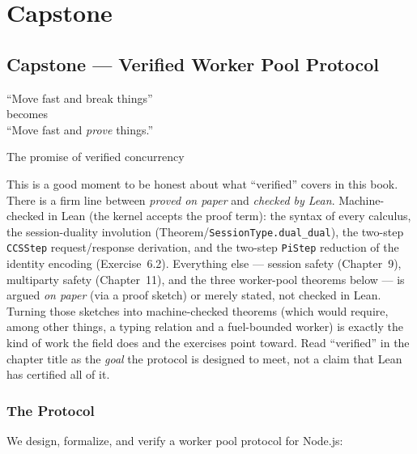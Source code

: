 \documentclass[11pt, a4paper, oneside]{book}
\newcommand{\lc}[1]{\texttt{#1}}
\newcounter{exercise}[chapter]
\begin{document}
\part{Capstone}

\chapter{Capstone --- Verified Worker Pool Protocol}

\epigraph{``Move fast and break things''\\
\normalfont becomes\\
``Move fast and \emph{prove} things.''}%
{The promise of verified concurrency}

\begin{warning}[title={``Verified'' means two different things --- be precise}]
This is a good moment to be honest about what ``verified'' covers in this book.
There is a firm line between \emph{proved on paper} and \emph{checked by Lean}.
Machine-checked in Lean (the kernel accepts the proof term): the syntax of
every calculus, the session-duality involution
(Theorem/\lc{SessionType.dual\_dual}), the two-step \lc{CCSStep} request/response
derivation, and the two-step \lc{PiStep} reduction of the identity encoding
(Exercise~6.2). Everything else --- session safety (Chapter~9), multiparty
safety (Chapter~11), and the three worker-pool theorems below --- is argued
\emph{on paper} (via a proof sketch) or merely stated, not checked in Lean. Turning those sketches
into machine-checked theorems (which would require, among other things, a
typing relation and a fuel-bounded worker) is exactly the kind of work the
field does and the exercises point toward. Read ``verified'' in the chapter
title as the \emph{goal} the protocol is designed to meet, not a claim that
Lean has certified all of it.
\end{warning}

\section{The Protocol}

We design, formalize, and verify a worker pool protocol for Node.js:
\end{document}
